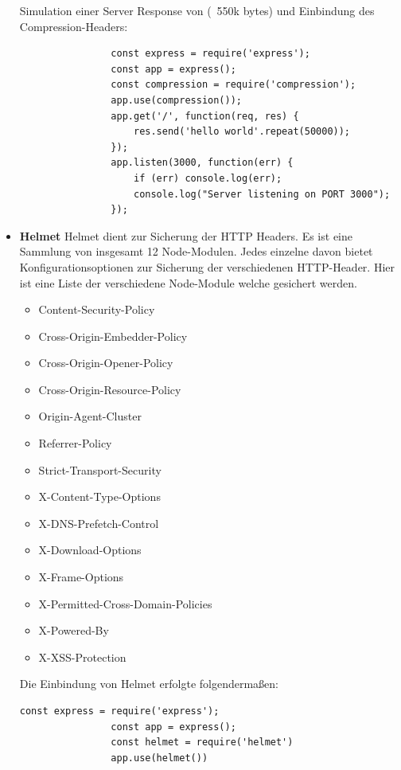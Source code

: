 \begin{itemize}
        Simulation einer Server Response von (~550k bytes) und Einbindung des Compression-Headers:
            \begin{lstlisting}
                const express = require('express');
                const app = express();
                const compression = require('compression');
                app.use(compression());
                app.get('/', function(req, res) {
                    res.send('hello world'.repeat(50000));
                });
                app.listen(3000, function(err) {
                    if (err) console.log(err);
                    console.log("Server listening on PORT 3000");
                });
            \end{lstlisting}
    \item \textbf{Helmet}
        \newline
        Helmet dient zur Sicherung der HTTP Headers. Es ist eine Sammlung von insgesamt 12 Node-Modulen. Jedes einzelne davon bietet Konfigurationsoptionen zur Sicherung der verschiedenen HTTP-Header. Hier ist eine Liste der verschiedene Node-Module welche gesichert werden.
        \begin{itemize}
            \item Content-Security-Policy
            \item Cross-Origin-Embedder-Policy
            \item Cross-Origin-Opener-Policy
            \item Cross-Origin-Resource-Policy
            \item Origin-Agent-Cluster
            \item Referrer-Policy
            \item Strict-Transport-Security
            \item X-Content-Type-Options
            \item X-DNS-Prefetch-Control
            \item X-Download-Options
            \item X-Frame-Options
            \item X-Permitted-Cross-Domain-Policies
            \item X-Powered-By
            \item X-XSS-Protection
        \end{itemize}
        \newpage
        Die Einbindung von Helmet erfolgte folgendermaßen:

            \begin{lstlisting}[caption=Verwendung von Helmet]
                const express = require('express');
                const app = express();
                const helmet = require('helmet')
                app.use(helmet())
            \end{lstlisting}


\end{itemize}
